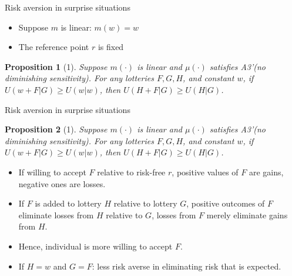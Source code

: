 \documentclass[11pt, aspectratio=169]{beamer}
\newtheorem{proposition}{Proposition}
\begin{document}
\begin{frame}{Risk aversion in surprise situations}
    \begin{itemize}
        \item Suppose $m$ is linear: $m(w)=w$\medskip
        \item The reference point $r$ is fixed\medskip
	\end{itemize}
    \begin{proposition}[1]
        Suppose $m(\cdot)$ is linear and $\mu(\cdot)$ satisfies A3'(no diminishing sensitivity).
        For any lotteries $F,G,H$, and constant $w$,        if $ U(w + F|G) \geq U(w|w)$, then $U(H+F|G) \geq U(H|G)$.\\
    \end{proposition}
\end{frame}

\begin{frame}{Risk aversion in surprise situations}
        \begin{proposition}[1]
        Suppose $m(\cdot)$ is linear and $\mu(\cdot)$ satisfies A3'(no diminishing sensitivity).
        For any lotteries $F,G,H$, and constant $w$, if $ U(w + F|G) \geq U(w|w)$, then $U(H+F|G) \geq U(H|G)$.\\
    \end{proposition}
     \begin{itemize}
        \item If willing to accept $F$ relative to risk-free $r$, positive values of $F$ are gains, negative ones are losses.\medskip
        \item If $F$ is added to lottery $H$ relative to lottery $G$, positive outcomes of $F$ eliminate losses from $H$ relative to $G$, losses from $F$ merely eliminate gains from $H$.\medskip
        \item Hence, individual is more willing to accept $F$.\medskip
        \item If $H=w$ and $G=F$:  less risk averse in eliminating risk that is expected.\medskip
	\end{itemize}
\end{frame}
\end{document}
